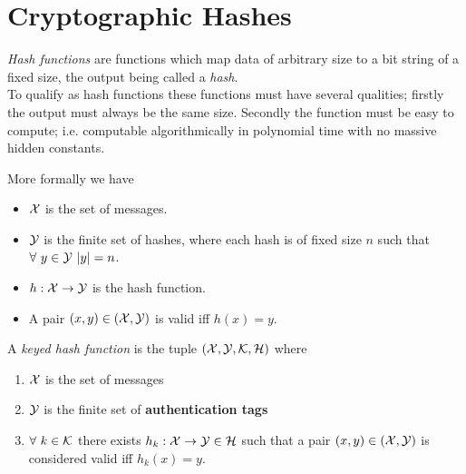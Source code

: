 \section{Cryptographic Hashes}

\textit{Hash functions} are functions which
map data of arbitrary size to a bit string of a fixed size,
the output being called a \textit{hash}.\\

To qualify as hash functions these functions must have several qualities;
firstly the output must always be the same size.
Secondly the function must be easy to compute;
i.e. computable algorithmically in polynomial time
with no massive hidden constants.\\

\begin{definition}
    More formally we have
    \begin{itemize}
        \item $\mathcal{X}$ is the set of messages.
        \item $\mathcal{Y}$ is the finite set of hashes,
            where each hash is of fixed size $n$ such that
            $\forall\ y \in \mathcal{Y}\ |y| = n$.
        \item $h : \mathcal{X} \rightarrow \mathcal{Y}$ is the hash function.
        \item A pair $(x,y) \in (\mathcal{X},\mathcal{Y})$ is valid iff $h(x) = y$.
    \end{itemize}
\end{definition}

\begin{definition}
    A \textit{keyed hash function} is the tuple $(\mathcal{X},\mathcal{Y},\mathcal{K},\mathcal{H})$ where
    \begin{enumerate}
        \item $\mathcal{X}$ is the set of messages
        \item $\mathcal{Y}$ is the finite set of \textbf{authentication tags}
        \item $\forall\ k \in \mathcal{K}$ there exists $h_k : \mathcal{X} \rightarrow \mathcal{Y} \in \mathcal{H}$
            such that a pair $(x,y) \in (\mathcal{X}, \mathcal{Y})$ is considered valid iff $h_k(x) = y$.
    \end{enumerate}
\end{definition}

